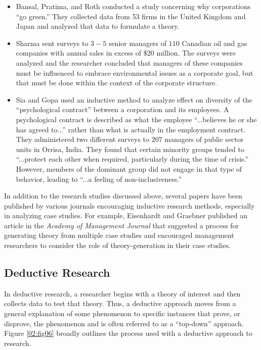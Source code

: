 \begin{itemize}
	\item Bansal, Pratima, and Roth\cite{bansal2000companies} conducted a study concerning why corporations ``go green.'' They collected data from 53 firms in the United Kingdom and Japan and analyzed that data to formulate a theory.

	\item Sharma\cite{sharma2000managerial} sent surveys to $ 3-5 $ senior managers of $ 110 $ Canadian oil and gas companies with annual sales in excess of $ \$20 $ million. The surveys were analyzed and the researcher concluded that managers of these companies must be influenced to embrace environmental issues as a corporate goal, but that must be done within the context of the corporate structure.  

	\item Sia and Gopa\cite{sia2009employees} used an inductive method to analyze effect on diversity of the ``psychological contract'' between a corporation and its employees. A psychological contract is described as what the employee ``...believes he or she has agreed to...'' rather than what is actually in the employment contract. They administered two different surveys to $ 207 $ managers of public sector units in Orrisa, India. They found that certain minority groups tended to ``...protect each other when required, particularly during the time of crisis.'' However, members of the dominant group did not engage in that type of behavior, leading to ``...a feeling of non-inclusiveness.''

\end{itemize}

In addition to the research studies discussed above, several papers have been published by various journals encouraging inductive research methods, especially in analyzing case studies. For example, Eisenhardt and Graebner\cite{eisenhardt2007theory} published an article in the \textit{Academy of Management Journal} that suggested  a process for generating theory from multiple case studies and encouraged management researchers to consider the role of theory-generation in their case studies. 

\subsection{Deductive Research}

In deductive research, a researcher begins with a theory of interest and then collects data to test that theory. Thus, a deductive approach moves from a general explanation of some phenomenon to specific instances that prove, or disprove, the phenomenon and is often referred to as a ``top-down'' approach. Figure \ref{02:fig06} broadly outlines the process used with a deductive approach to research.

